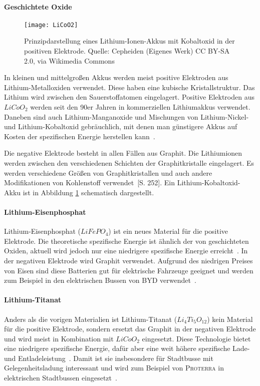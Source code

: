 \paragraph{Geschichtete Oxide}

\begin{figure}\centering
	\texttt{[image: LiCoO2]}
	\caption[Prinzipdarstellung eines Lithium-Ionen-Akkus]{Prinzipdarstellung eines Lithium-Ionen-Akkus mit Kobaltoxid in der positiven Elektrode. Quelle: Cepheiden (Eigenes Werk) CC BY-SA 2.0, via Wikimedia Commons} %
	\label{abb_LiCoO2}
\end{figure}

In kleinen und mittelgroßen Akkus werden meist positive Elektroden aus Lithium-Metalloxiden verwendet. Diese haben eine kubische Kristallstruktur. Das Lithium wird zwischen den Sauerstoffatomen eingelagert. Positive Elektroden aus $LiCoO_2$ werden seit den 90er Jahren in kommerziellen Lithiumakkus verwendet. Daneben sind auch Lithium-Manganoxide und Mischungen von Lithium-Nickel- und Lithium-Kobaltoxid gebräuchlich, mit denen man günstigere Akkus auf Kosten der spezifischen Energie herstellen kann~\cite{whittingham2004lithium}. %

Die negative Elektrode besteht in allen Fällen aus Graphit. Die Lithiumionen werden zwischen den verschiedenen Schichten der Graphitkristalle eingelagert. Es werden verschiedene Größen von Graphitkristallen und auch andere Modifikationen von Kohlenstoff verwendet~\cite{Sterner:2014}[S. 252]. Ein Lithium-Kobaltoxid-Akku ist in Abbildung \ref{abb_LiCoO2} schematisch dargestellt.

\paragraph{Lithium-Eisenphosphat}
Lithium-Eisenphosphat ($LiFePO_4$) ist ein neues Material für die positive Elektrode. Die theoretische spezifische Energie ist ähnlich der von geschichteten Oxiden, aktuell wird jedoch nur eine niedrigere spezifische Energie erreicht~\cite{Tie201382}. In der negativen Elektrode wird Graphit verwendet. Aufgrund des niedrigen Preises von Eisen sind diese Batterien gut für elektrische Fahrzeuge geeignet und werden zum Beispiel in den elektrischen Bussen von \textsc{BYD} verwendet~\cite{bydSpecs}.

\paragraph{Lithium-Titanat}
Anders als die vorigen Materialien ist Lithium-Titanat ($Li_4Ti_5O_{12}$) kein Material für die positive Elektrode, sondern ersetzt das Graphit in der negativen Elektrode und wird meist in Kombination mit $LiCoO_2$ eingesetzt. Diese Technologie bietet eine niedrigere spezifische Energie, dafür aber eine weit höhere spezifische Lade- und Entladeleistung~\cite{veneri2012charging}. Damit ist sie insbesondere für Stadtbusse mit Gelegenheitsladung interessant und wird zum Beispiel von \textsc{Proterra} in elektrischen Stadtbussen eingesetzt~\cite{protCat}. 

